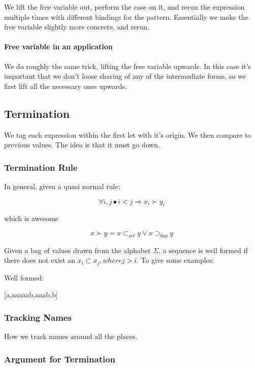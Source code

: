 \documentclass{sigplanconf}
\begin{document}
We lift the free variable out, perform the case on it, and rerun the expression multiple times with different bindings for the pattern. Essentially we make the free variable slightly more concrete, and rerun.

\paragraph{Free variable in an application}

We do roughly the same trick, lifting the free variable upwards. In this case it's important that we don't loose sharing of any of the intermediate forms, so we first lift all the necessary ones upwards.



\subsection{Termination}
\label{sec:term}

We tag each expression within the first let with it's origin. We then compare to previous values. The idea is that it must go down.

\subsubsection{Termination Rule}

In general, given a quasi normal rule:

\[
\forall i, j \bullet i < j \Rightarrow x_i \succ y_i
\]

which is awesome

\[
x \succ y = x \subset_{set} y \vee x \supset_{bag} y
\]

Given a bag of values drawn from the alphabet $\Sigma$, a sequence is well formed if there does not exist an $x_i \subset x_j, where j > i$. To give some examples:

Well formed:

[a,aaaaab,aaab,b]

\subsubsection{Tracking Names}

How we track names around all the places.

\subsubsection{Argument for Termination}
\end{document}
